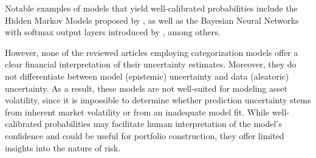 Notable examples of models that yield well-calibrated probabilities include the Hidden Markov Models proposed by \textcite{zhang2019high, su2022hmm, park2011trend}, as well as the Bayesian Neural Networks with softmax output layers introduced by \textcite{magris2023bayesian}, among others.

However, none of the reviewed articles employing categorization models offer a clear financial interpretation of their uncertainty estimates. Moreover, they do not differentiate between model (epistemic) uncertainty and data (aleatoric) uncertainty. As a result, these models are not well-suited for modeling asset volatility, since it is impossible to determine whether prediction uncertainty stems from inherent market volatility or from an inadequate model fit. While well-calibrated probabilities may facilitate human interpretation of the model's confidence and could be useful for portfolio construction, they offer limited insights into the nature of risk.


